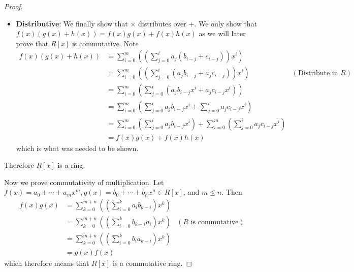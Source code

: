 \begin{proof}
\begin{itemize}
        \item \textbf{Distributive}: We finally show that $\times$ distributes over $+$. We only show that $f(x)(g(x) + h(x)) = f(x)g(x) + f(x)h(x)$ as we will later prove that $R[x]$ is commutative. Note
        \begin{align*}
            f(x)(g(x) + h(x)) &= \sum_{i=0}^m\left(\left(\sum_{j=0}^ia_j(b_{i-j}+c_{i-j})\right)x^i\right)\\
            &= \sum_{i=0}^m\left(\left(\sum_{j=0}^i(a_jb_{i-j}+a_jc_{i-j})\right)x^i\right) & (\text{Distribute in }R)\\
            &= \sum_{i=0}^m\left(\sum_{j=0}^i(a_jb_{i-j}x^i+a_jc_{i-j}x^i)\right)\\
            &= \sum_{i=0}^m\left(\sum_{j=0}^ia_jb_{i-j}x^i + \sum_{j=0}^ia_jc_{i-j}x^i\right)\\
            &= \sum_{i=0}^m\left(\sum_{j=0}^ia_jb_{i-j}x^i\right) + \sum_{i=0}^m\left(\sum_{j=0}^ia_jc_{i-j}x^i\right)\\
            &= f(x)g(x) + f(x)h(x)
        \end{align*}
        which is what was needed to be shown.
    \end{itemize}
    Therefore $R[x]$ is a ring.

    Now we prove commutativity of multiplication. Let $f(x) = a_0 + \cdots + a_mx^m, g(x) = b_0 + \cdots + b_nx^n \in R[x]$, and $m \leq n$. Then
    \begin{align*}
        f(x)g(x) &= \sum_{k=0}^{m+n}\left(\left(\sum_{i=0}^k a_ib_{k-i}\right)x^k\right)\\
        &= \sum_{k=0}^{m+n}\left(\left(\sum_{i=0}^k b_{k-i}a_i\right)x^k\right) & (R\text{ is commutative})\\
        &= \sum_{k=0}^{m+n}\left(\left(\sum_{i=0}^k b_i a_{k-i}\right)x^k\right)\\
        &= g(x)f(x)
    \end{align*}
    which therefore means that $R[x]$ is a commutative ring.
\end{proof}

